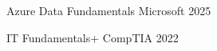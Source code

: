 

\begin{cvhonors}

  \cvhonor
    {Azure Data Fundamentals} %
    {Microsoft} %
    {} %
    {2025} %

  \cvhonor
    {IT Fundamentals+} %
    {CompTIA} %
    {} %
    {2022} %

\end{cvhonors}

